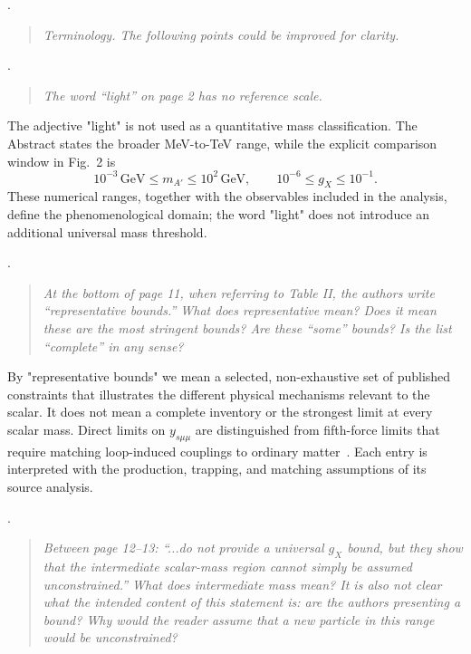 \documentclass[12pt,a4paper]{article}
\begin{document}
\medskip
{}. \begin{quote}\itshape
Terminology. The following points could be improved for clarity.
\end{quote}

\medskip
{}. \begin{quote}\itshape
The word ``light'' on page 2 has no reference scale.
\end{quote}

The adjective "light" is not used as a quantitative mass classification. The Abstract states the broader MeV-to-TeV range, while the explicit comparison window in Fig.~2 is
\[
10^{-3}\,\mathrm{GeV}\leq m_{A'}\leq10^2\,\mathrm{GeV},
\qquad
10^{-6}\leq g_X\leq10^{-1}.
\]
These numerical ranges, together with the observables included in the analysis, define the phenomenological domain; the word "light" does not introduce an additional universal mass threshold.

\medskip
{}. \begin{quote}\itshape
At the bottom of page 11, when referring to Table II, the authors write ``representative bounds.'' What does representative mean? Does it mean these are the most stringent bounds? Are these ``some'' bounds? Is the list ``complete'' in any sense?
\end{quote}

By "representative bounds" we mean a selected, non-exhaustive set of published constraints that illustrates the different physical mechanisms relevant to the scalar. It does not mean a complete inventory or the strongest limit at every scalar mass. Direct limits on \(y_{s\mu\mu}\) are distinguished from fifth-force limits that require matching loop-induced couplings to ordinary matter~\cite{Liu:2025zuz,Fiorillo:2026wso,Caputo:2021rux,Hoskins:1985tn,Kapner:2006si,Blakemore:2021zna}. Each entry is interpreted with the production, trapping, and matching assumptions of its source analysis.

\medskip
{}. \begin{quote}\itshape
Between page 12--13: ``...do not provide a universal \(g_X\) bound, but they show that the intermediate scalar-mass region cannot simply be assumed unconstrained.'' What does intermediate mass mean? It is also not clear what the intended content of this statement is: are the authors presenting a bound? Why would the reader assume that a new particle in this range would be unconstrained?
\end{quote}
\end{document}
